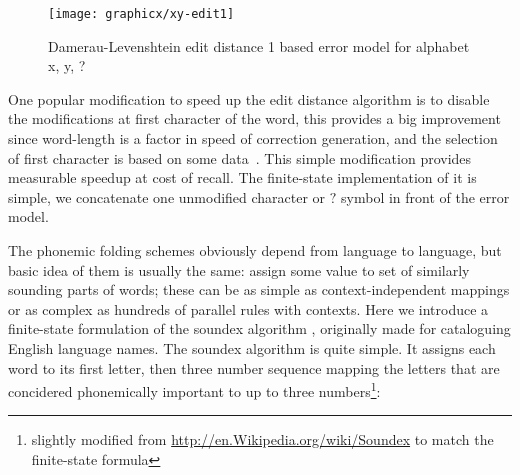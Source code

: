 \documentclass[a4paper,12pt]{article}
\begin{document}
\begin{figure}
    \centering
    \texttt{[image: graphicx/xy-edit1]}
    \caption{Damerau-Levenshtein edit distance 1 based error model for
        alphabet {x, y, ?}
    \label{fig:xy-edit-1}}
\end{figure}

One popular modification to speed up the edit distance algorithm is to disable
the modifications at first character of the word, this provides a big
improvement since word-length is a factor in speed of correction generation,
and the selection of first character is based on some
data~\cite[]{bhagat2007spelling}.  This simple modification provides measurable
speedup at cost of recall. The finite-state implementation of it is simple, we
concatenate one unmodified character or $?$ symbol in front of the error model.

The phonemic folding schemes obviously depend from language to language, but
basic idea of them is usually the same: assign some value to set of similarly
sounding parts of words; these can be as simple as context-independent mappings
or as complex as hundreds of parallel rules with contexts. Here we introduce a
finite-state formulation of the soundex algorithm \cite{russell1918soundex},
originally made for cataloguing English language names. The soundex algorithm
is quite simple. It assigns each word to its first letter, then three number
sequence mapping the letters that are concidered phonemically important to up
to three numbers\footnote{slightly modified from
\url{http://en.Wikipedia.org/wiki/Soundex} to match the finite-state formula}:
\end{document}
